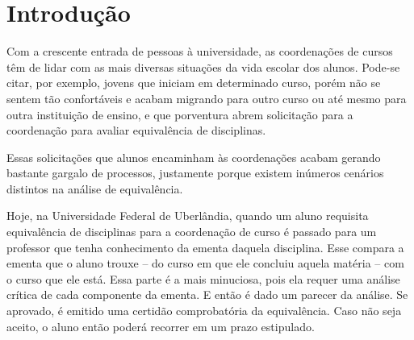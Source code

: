 \documentclass[12pt, %
openright, 
oneside, %
a4paper,    %
brazil]{facom-ufu-abntex2}
\begin{document}

\tableofcontents*
\cleardoublepage





\textual



\chapter[Introdução]{Introdução}
Com a crescente entrada de pessoas à universidade, as coordenações de cursos têm de lidar com as mais diversas situações da vida escolar dos alunos. Pode-se citar, por exemplo, jovens que iniciam em determinado curso, porém não se sentem tão confortáveis e acabam migrando para outro curso ou até mesmo para outra instituição de ensino, e que porventura abrem solicitação para a coordenação para avaliar equivalência de disciplinas.

Essas solicitações que alunos encaminham às coordenações acabam gerando bastante gargalo de processos, justamente porque existem inúmeros cenários distintos na análise de equivalência.

Hoje, na Universidade Federal de Uberlândia, quando um aluno requisita equivalência de disciplinas para a coordenação de curso é passado para um professor que tenha conhecimento da ementa daquela disciplina. Esse compara a ementa que o aluno trouxe – do curso em que ele concluiu aquela matéria – com o curso que ele está. Essa parte é a mais minuciosa, pois ela requer uma análise crítica de cada componente da ementa. E então é dado um parecer da análise. Se aprovado, é emitido uma certidão comprobatória da equivalência. Caso não seja aceito, o aluno então poderá recorrer em um prazo estipulado. 
\end{document}
